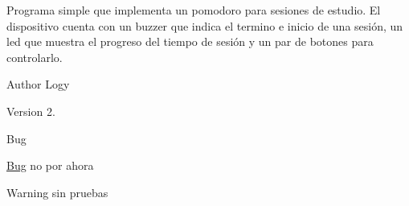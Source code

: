 Programa simple que implementa un pomodoro para sesiones de estudio. El dispositivo cuenta con un buzzer que indica el termino e inicio de una sesión, un led que muestra el progreso del tiempo de sesión y un par de botones para controlarlo.

\begin{DoxyAuthor}{Author}
Logy 
\end{DoxyAuthor}
\begin{DoxyVersion}{Version}
2. 
\end{DoxyVersion}
\begin{DoxyRefDesc}{Bug}
\item[\mbox{\hyperlink{bug__bug000001}{Bug}}]no por ahora \end{DoxyRefDesc}
\begin{DoxyWarning}{Warning}
sin pruebas 
\end{DoxyWarning}
